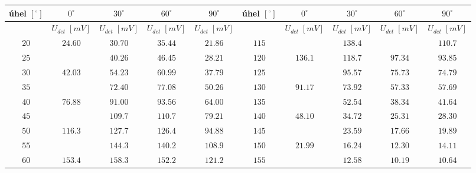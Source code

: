 \begin{tabular}{|c|c|c|c|c||c|c|c|c|c|}
    \hline
    úhel \([^\circ]\) & \cellcolor[HTML]{34FF34}\(0^\circ\) & \cellcolor[HTML]{FE5050}\(30^\circ\) & \cellcolor[HTML]{5050FF}\(60^\circ\) & \cellcolor[HTML]{F56B00}\(90^\circ\) & 
    úhel \([^\circ]\) & \cellcolor[HTML]{34FF34}\(0^\circ\) & \cellcolor[HTML]{FE5050}\(30^\circ\) & \cellcolor[HTML]{5050FF}\(60^\circ\) & \cellcolor[HTML]{F56B00}\(90^\circ\) \\ \hline
                & \(U_{det}\;[mV]\) & \(U_{det}\;[mV]\) & \(U_{det}\;[mV]\)& \(U_{det}\;[mV]\) & & \(U_{det}\;[mV]\)& \(U_{det}\;[mV]\)& \(U_{det}\;[mV]\)& \(U_{det}\;[mV]\) \\ \hline
    \(20\)            & \(24.60\)   & \(30.70\)    & \(35.44\)    & \(21.86\)    & \(115 \)           &              & \(138.4\)    &              & \(110.7\)    \\ \hline 
    \(25\)            &             & \(40.26\)    & \(46.45\)    & \(28.21\)    & \(120\)           & \(136.1\)    & \(118.7\)    & \(97.34\)    & \(93.85\)    \\ \hline 
    \(30\)            & \(42.03\)   & \(54.23\)    & \(60.99\)    & \(37.79\)    & \(125\)           &              & \(95.57\)    & \(75.73\)    & \(74.79\)    \\ \hline 
    \(35\)            &             & \(72.40\)    & \(77.08\)    & \(50.26\)    & \(130\)           & \(91.17\)    & \(73.92\)    & \(57.33\)    & \(57.69\)    \\ \hline 
    \(40\)            & \(76.88\)   & \(91.00\)    & \(93.56\)    & \(64.00\)    & \(135\)           &              & \(52.54\)    & \(38.34\)    & \(41.64\)    \\ \hline 
    \(45\)            &             & \(109.7\)    & \(110.7\)    & \(79.21\)    & \(140\)           & \(48.10\)    & \(34.72\)    & \(25.31\)    & \(28.30\)    \\ \hline 
    \(50\)            & \(116.3\)   & \(127.7\)    & \(126.4\)    & \(94.88\)    & \(145\)           &              & \(23.59\)    & \(17.66\)    & \(19.89\)    \\ \hline 
    \(55\)            &             & \(144.3\)    & \(140.2\)    & \(108.9\)    & \(150\)           & \(21.99\)    & \(16.24\)    & \(12.30\)    & \(14.11\)    \\ \hline 
    \(60\)            & \(153.4\)   & \(158.3\)    & \(152.2\)    & \(121.2\)    & \(155\)           &              & \(12.58\)    & \(10.19\)    & \(10.64\)    \\ \hline 

\end{tabular}
